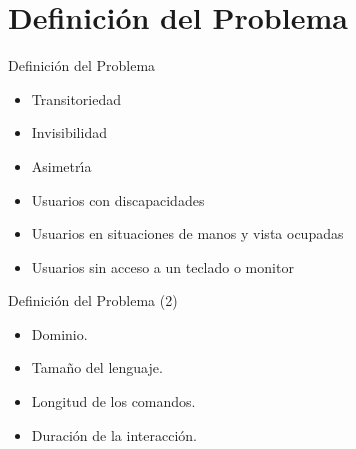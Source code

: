 \section{Definici\'on del Problema}

\begin{frame}{Definici\'on del Problema}


\begin{itemize}
    \vfill \item<+->{ Transitoriedad }
    \vfill \item<+->{ Invisibilidad }
    \vfill \item<+->{ Asimetr{\'\i}a }
\end{itemize}


\begin{itemize}
    \vfill \item<+->{ Usuarios con discapacidades }
    \vfill \item<+->{ Usuarios en situaciones de manos y vista ocupadas }
    \vfill \item<+->{ Usuarios sin acceso a un teclado o monitor }
\end{itemize}

\end{frame}

\begin{frame}{Definici\'on del Problema (2)}

\begin{itemize}
    \vfill \item<+->{Dominio.}
    \vfill \item<+->{Tama\~no del lenguaje.}
    \vfill \item<+->{Longitud de los comandos.}
    \vfill \item<+->{Duraci\'on de la interacci\'on.}
\end{itemize}

\end{frame}